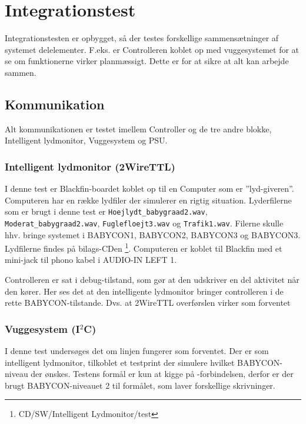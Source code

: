 \chapter{Integrationstest}

Integrationstesten er opbygget, så der testes forskellige sammensætninger af systemet delelementer. F.eks. er Controlleren koblet op med vuggesystemet for at se om funktionerne virker planmæssigt. Dette er for at sikre at alt kan arbejde sammen.

\section{Kommunikation}

Alt kommunikationen er testet imellem Controller og de tre andre blokke, Intelligent lydmonitor, Vuggesystem og PSU.

\subsection*{Intelligent lydmonitor (2WireTTL)}

I denne test er Blackfin-boardet koblet op til en Computer som er ''lyd-giveren''. Computeren har en række lydfiler der simulerer en rigtig situation. Lyderfilerne som er brugt i denne test er \verb+Hoejlydt_babygraad2.wav+, \verb+Moderat_babygraad2.wav+, \verb+Fuglefloejt3.wav+ og \verb+Trafik1.wav+. Filerne skulle hhv. bringe systemet i BABYCON1, BABYCON2, BABYCON3 og BABYCON3. Lydfilerne findes på bilags-CDen \citep{cd}\footnote{CD/SW/Intelligent Lydmonitor/test}. Computeren er koblet til Blackfin med et mini-jack til phono kabel i AUDIO-IN LEFT 1. 


Controlleren er sat i debug-tilstand, som gør at den udskriver en del aktivitet når den kører. Her ses det at den intelligente lydmonitor bringer controlleren i de rette BABYCON-tilstande. Dvs. at 2WireTTL overførslen virker som forventet

\subsection*{Vuggesystem (I$^2$C)}

I denne test undersøges det om \iic linjen fungerer som forventet. Der er som intelligent lydmonitor, tilkoblet et testprint der simulere hvilket BABYCON-niveau der ønskes. Testens formål er kun at kigge på \iic-forbindelsen, derfor er der brugt BABYCON-niveauet 2 til formålet, som laver forskellige skrivninger.


